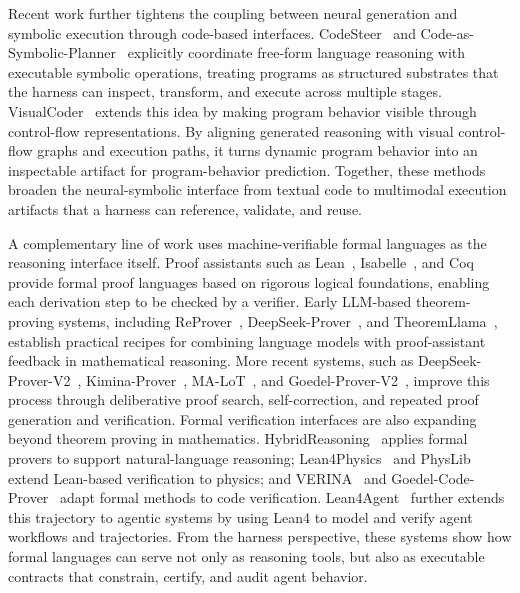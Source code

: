 \documentclass{llmxive}
\begin{document}
Recent work further tightens the coupling between neural generation and symbolic execution through code-based interfaces. CodeSteer~\cite{chen2025codesteer} and Code-as-Symbolic-Planner~\cite{chen2025code} explicitly coordinate free-form language reasoning with executable symbolic operations, treating programs as structured substrates that the harness can inspect, transform, and execute across multiple stages. VisualCoder~\cite{chi-etal-2025-visualcoder} extends this idea by making program behavior visible through control-flow representations. By aligning generated reasoning with visual control-flow graphs and execution paths, it turns dynamic program behavior into an inspectable artifact for program-behavior prediction. Together, these methods broaden the neural-symbolic interface from textual code to multimodal execution artifacts that a harness can reference, validate, and reuse.

A complementary line of work uses machine-verifiable formal languages as the reasoning interface itself. Proof assistants such as Lean~\cite{moura2021lean}, Isabelle~\cite{nipkow2002isabelle}, and Coq~\cite{barras1999coq} provide formal proof languages based on rigorous logical foundations, enabling each derivation step to be checked by a verifier. Early LLM-based theorem-proving systems, including ReProver~\cite{yang2023leandojo}, DeepSeek-Prover~\cite{xin2025deepseek}, and TheoremLlama~\cite{wang2024theoremllama}, establish practical recipes for combining language models with proof-assistant feedback in mathematical reasoning. More recent systems, such as DeepSeek-Prover-V2~\cite{ren2025deepseek2}, Kimina-Prover~\cite{wang2025kimina}, MA-LoT~\cite{wang2025ma}, and Goedel-Prover-V2~\cite{lin2025goedel2}, improve this process through deliberative proof search, self-correction, and repeated proof generation and verification.
Formal verification interfaces are also expanding beyond theorem proving in mathematics. HybridReasoning~\cite{wang2025let} applies formal provers to support natural-language reasoning; Lean4Physics~\cite{li2025lean4physics} and PhysLib~\cite{physlib} extend Lean-based verification to physics; and VERINA~\cite{ye2025verina} and Goedel-Code-Prover~\cite{li2026goedel} adapt formal methods to code verification. Lean4Agent~\cite{wang2026lean4agent} further extends this trajectory to agentic systems by using Lean4 to model and verify agent workflows and trajectories. From the harness perspective, these systems show how formal languages can serve not only as reasoning tools, but also as executable contracts that constrain, certify, and audit agent behavior.
\end{document}
